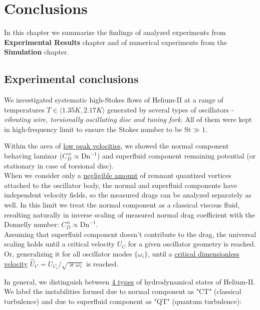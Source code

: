 \chapter{Conclusions}

In this chapter we summarize the findings of analyzed experiments from \textbf{Experimental Results} chapter and of numerical experiments from the \textbf{Simulation} chapter.

\section{Experimental conclusions}

We investigated systematic high-Stokes flows of Helium-II at a range of temperatures $T \in \langle 1.35 \unit{K}, 2.17 \unit{K} \rangle$ generated by several types of oscillators - \textit{vibrating wire, torsionally oscillating disc and tuning
fork}. All of them were kept in high-frequency limit to ensure the Stokes number to be St$\gg 1$.

Within the area of \underline{low peak velocities}, we showed the normal component behaving laminar ($C_D^{\, n} \propto \text{Dn}^{-1}$) and superfluid component remaining potential (or stationary in case of torsional disc).\\
When we consider only a \underline{negligible amount} of remnant quantized vortices attached to the oscillator body, the normal and superfluid components have independent velocity fields, so the measured drags can be analyzed separately as well. In this limit we treat the normal component as a classical viscous fluid, resulting naturally in inverse scaling of measured normal drag coefficient with the Donnelly number: $C_D^{\, n} \propto \text{Dn}^{-1}$.\\
Assuming that superfluid component doesn't contribute to the drag, the universal scaling holds until a critical velocity $U_C$ for a given oscillator geometry is reached. Or, generalizing it for all oscillator modes $\{\omega_i\}$, until a \underline{critical dimensionless velocity} $\hat{U}_C = U_{C_i} / \sqrt{\varkappa \omega_i}$ is reached.

In general, we distinguish between \underline{4 types} of hydrodynamical states of Helium-II. We label the instabilities formed due to normal component as "CT" (classical turbulence) and due to superfluid component as "QT" (quantum turbulence):

